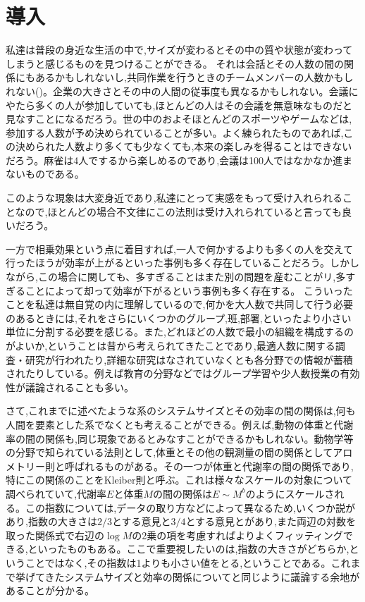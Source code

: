 \chapter{導入}

私達は普段の身近な生活の中で,サイズが変わるとその中の質や状態が変わってしまうと感じるものを見つけることができる。
それは会話とその人数の間の関係にもあるかもしれないし,共同作業を行うときのチームメンバーの人数かもしれない(\cite{kaigi4})。企業の大きさとその中の人間の従事度も異なるかもしれない。会議にやたら多くの人が参加していても,ほとんどの人はその会議を無意味なものだと見なすことになるだろう。世の中のおよそほとんどのスポーツやゲームなどは,参加する人数が予め決められていることが多い。よく練られたものであれば,この決められた人数より多くても少なくても,本来の楽しみを得ることはできないだろう。麻雀は4人でするから楽しめるのであり,会議は100人ではなかなか進まないものである。

このような現象は大変身近であり,私達にとって実感をもって受け入れられることなので,ほとんどの場合不文律にこの法則は受け入れられていると言っても良いだろう。

一方で相乗効果という点に着目すれば,一人で何かするよりも多くの人を交えて行ったほうが効率が上がるといった事例も多く存在していることだろう。しかしながら,この場合に関しても、多すぎることはまた別の問題を産むことがリ,多すぎることによって却って効率が下がるという事例も多く存在する。
こういったことを私達は無自覚の内に理解しているので,何かを大人数で共同して行う必要のあるときには,それをさらにいくつかのグループ,班,部署,といったより小さい単位に分割する必要を感じる。また,どれほどの人数で最小の組織を構成するのがよいか,ということは昔から考えられてきたことであり,最適人数に関する調査・研究が行われたり,詳細な研究はなされていなくとも各分野での情報が蓄積されたりしている。例えば教育の分野などではグループ学習や少人数授業の有効性が議論されることも多い。

さて,これまでに述べたような系のシステムサイズとその効率の間の関係は,何も人間を要素とした系でなくとも考えることができる。例えば,動物の体重と代謝率の間の関係も,同じ現象であるとみなすことができるかもしれない。動物学等の分野で知られている法則として,体重とその他の観測量の間の関係としてアロメトリー則と呼ばれるものがある。その一つが体重と代謝率の間の関係であり,特にこの関係のことをKleiber則と呼ぶ。これは様々なスケールの対象について調べられていて,代謝率$E$と体重$M$の間の関係は$E\sim M^{b}$のようにスケールされる。この指数については,データの取り方などによって異なるため,いくつか説があり,指数の大きさは$2/3$とする意見と$3/4$とする意見とがあり,また両辺の対数を取った関係式で右辺の$\log M$の2乗の項を考慮すればよりよくフィッティングできる,といったものもある。ここで重要視したいのは,指数の大きさがどちらか,ということではなく,その指数は1よりも小さい値をとる,ということである。これまで挙げてきたシステムサイズと効率の関係についてと同じように議論する余地があることが分かる。

